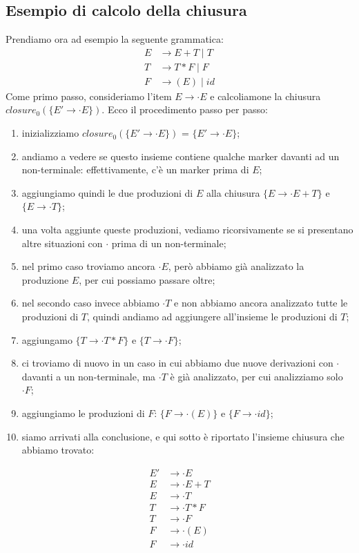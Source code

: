 \documentclass[class=book, crop=false, oneside, 12pt]{standalone}
\begin{document}
\subsection{Esempio di calcolo della chiusura}
Prendiamo ora ad esempio la seguente grammatica:
\begin{align*}
    E &\to E+T \mid T\\
    T &\to T*F \mid F\\
    F &\to (E) \mid id
\end{align*}
Come primo passo, consideriamo l'item \(E \to \cdot E\) e calcoliamone la chiusura \(closure_0(\{E' \to \cdot E\})\). Ecco il procedimento passo per passo:
\begin{enumerate}
    \item inizializziamo \(closure_0(\{E' \to \cdot E\})\) = \(\{E' \to \cdot E\}\); 
    \item andiamo a vedere se questo insieme contiene qualche marker davanti ad un non-terminale: effettivamente, c'è un marker prima di \(E\);
    \item aggiungiamo quindi le due produzioni di \(E\) alla chiusura \(\{E \to \cdot E+T\}\) e \(\{E \to \cdot T\}\);
    \item una volta aggiunte queste produzioni, vediamo ricorsivamente se si presentano altre situazioni con \(\cdot\) prima di un non-terminale;
    \item nel primo caso troviamo ancora \(\cdot E\), però abbiamo già analizzato la produzione \(E\), per cui possiamo passare oltre;
    \item nel secondo caso invece abbiamo \(\cdot T\) e non abbiamo ancora analizzato tutte le produzioni di \(T\), quindi andiamo ad aggiungere all'insieme le produzioni di \(T\);
    \item aggiungamo \(\{T \to \cdot T * F\}\) e \(\{T \to \cdot F\}\);
    \item ci troviamo di nuovo in un caso in cui abbiamo due nuove derivazioni con \(\cdot\) davanti
    a un non-terminale, ma \(\cdot T\) è già analizzato, per cui analizziamo solo \(\cdot F\);
    \item aggiungiamo le produzioni di \(F\): \(\{F \to \cdot (E)\}\) e \(\{F \to \cdot id \}\);
    \item siamo arrivati alla conclusione, e qui sotto è riportato l'insieme chiusura che abbiamo trovato:
\end{enumerate}
\begin{align*}
    E' &\to \cdot E \\
    E  &\to \cdot E+T \\
    E  &\to \cdot T \\
    T  &\to \cdot T * F \\
    T  &\to \cdot F \\
    F  &\to \cdot (E) \\
    F  &\to \cdot id
\end{align*}
\end{document}

